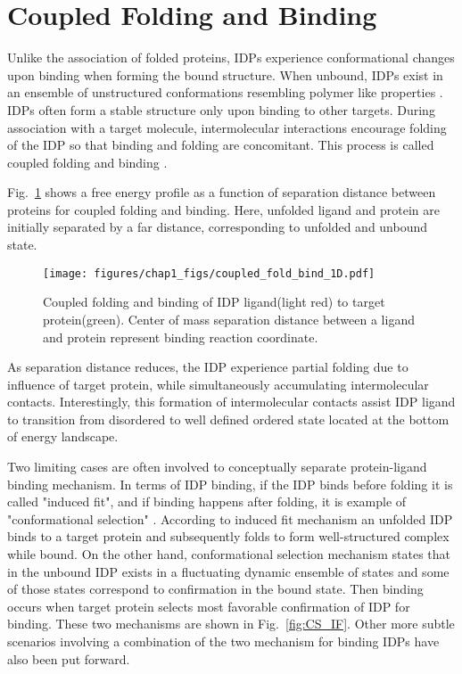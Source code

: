 \documentclass[../talant.diss.submit.tex]{subfiles}
\begin{document}
%
\section{\textbf{Coupled Folding and Binding}}\label{sect:one_four}

Unlike the association of folded proteins, IDPs experience conformational changes upon binding
when forming the bound structure. When unbound, IDPs exist in an ensemble
of unstructured conformations resembling polymer like properties
\cite{wright:99,dunker:01,uversky:00n,kiefhaber:12}.
IDPs often form a stable structure only upon binding to other targets.
During association with a target molecule, intermolecular interactions encourage
folding of the IDP so that binding and folding are concomitant.
This process is called coupled folding and binding
\cite{dyson:02,wright:09,turjanski:08,wright:99,sugase:07,huang:09}.

Fig.~\ref{fig:foldinglandscape} shows a free energy profile as a function of
separation distance between proteins for coupled folding and binding.
Here, unfolded ligand and protein are initially separated by a far distance,
corresponding to unfolded and unbound state. 
%
\begin{figure}[htp!]
  \begin{centering}
    \texttt{[image: figures/chap1\_figs/coupled\_fold\_bind\_1D.pdf]}
    \caption{Coupled folding and binding of IDP ligand(light red) to
      target protein(green). Center of mass separation distance between
      a ligand and protein represent binding reaction coordinate.}
    \label{fig:foldinglandscape}
  \end{centering}
\end{figure}
%
%
As separation distance reduces, the IDP experience partial folding due to influence of
target protein, while simultaneously accumulating intermolecular contacts. Interestingly, this formation
of intermolecular contacts assist IDP ligand to transition from disordered to well
defined ordered state located at the bottom of energy landscape. 

Two limiting cases are often involved to conceptually separate protein-ligand binding
mechanism. In terms of IDP binding, if the IDP binds before folding it is called
"induced fit", and if binding happens after folding, it is example of
"conformational selection"
\cite{koshland:95k,boehr:09,Koshland-Jr:58,de-sancho:12,espinoza-fonseca:09a}.
According to induced fit mechanism an unfolded IDP binds to a target protein and
subsequently folds to form well-structured complex while bound. On the other hand,
conformational selection mechanism states that in the unbound IDP exists in a fluctuating dynamic
ensemble of states and some of those states correspond to confirmation in the bound state. Then
binding occurs when target protein selects most favorable confirmation of IDP for
binding. These two mechanisms are shown in Fig.~\ref{fig:CS_IF}. Other more subtle scenarios
involving a combination of the two mechanism for binding IDPs have also been
put forward.\cite{espinoza-fonseca:09a}
\end{document}
